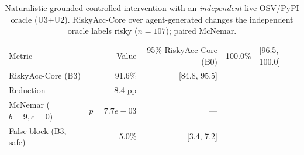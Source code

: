 \begin{table}[t]\centering
\caption{Naturalistic-grounded controlled intervention with an \emph{independent} live-OSV/PyPI oracle (U3+U2). RiskyAcc-Core over agent-generated changes the independent oracle labels risky ($n=107$); paired McNemar.}
\label{tab:e1a-indep}
\begin{tabular}{lrr}
\toprule
Metric & Value & 95\%%
\midrule
RiskyAcc-Core (B0) & 100.0\% & [96.5, 100.0] \\
RiskyAcc-Core (B3) & 91.6\% & [84.8, 95.5] \\
Reduction & 8.4 pp & --- \\
McNemar ($b{=}9,c{=}0$) & $p{=}7.7e-03$ & --- \\
False-block (B3, safe) & 5.0\% & [3.4, 7.2] \\
\bottomrule
\end{tabular}
\end{table}
